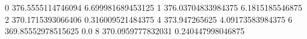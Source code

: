 0 376.5555114746094 6.699981689453125
1 376.03704833984375 6.1815185546875
2 370.1715393066406 0.316009521484375
4 373.947265625 4.09173583984375
6 369.85552978515625 0.0
8 370.0959777832031 0.240447998046875
